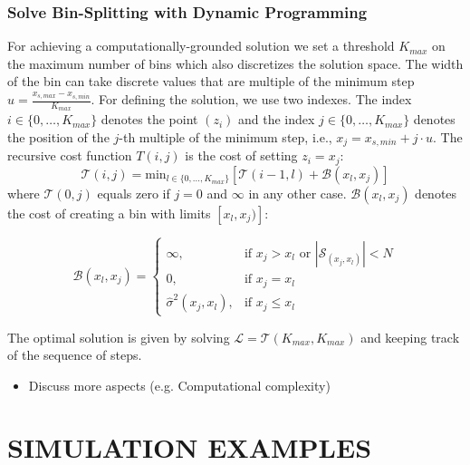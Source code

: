 \documentclass[twoside]{article}
\begin{document}
\subsubsection{Solve Bin-Splitting with Dynamic Programming}
\label{sec:dynamic-programing}

For achieving a computationally-grounded solution we set a threshold
\(K_{max}\) on the maximum number of bins which also discretizes the
solution space. The width of the bin can take discrete values that are
multiple of the minimum step
\(u = \frac{x_{s, max} - x_{s, min}}{K_{max}}\). For defining the
solution, we use two indexes. The index
\(i \in \{0, \ldots, K_{max}\}\) denotes the point \((z_i)\) and the
index \(j \in \{0, \ldots, K_{max}\} \) denotes the position of the
\(j\)-th multiple of the minimum step, i.e., 
\(x_j = x_{s,min} + j \cdot u\). The recursive cost function
\(T(i,j)\) is the cost of setting \(z_i=x_j\):
\begin{equation}
  \label{eq:recursive_cost}
  \mathcal{T}(i,j) = \mathrm{min}_{l \in \{0, \ldots, K_{max}\}} \left [ \mathcal{T}(i-1, l) + \mathcal{B}(x_l, x_j) \right ]
\end{equation}
%
where \(\mathcal{T}(0,j)\) equals zero if \(j=0\) and \(\infty\) in
any other case. \(\mathcal{B}(x_l, x_j)\) denotes the cost of creating a bin
with limits \([x_l, x_j)]\):

\begin{equation}
  \label{eq:cost_step}
  \mathcal{B}(x_l, x_j) = \begin{cases}
                            \infty, & \text{if $x_j > x_l$ or \(|\mathcal{S}_{(x_j, x_l)}| < N\)}\\
                            0, & \text{if $x_j = x_l$}\\
                            \hat{\sigma}^2(x_j, x_l), &\text{if $x_j \leq x_l$}
  \end{cases}
\end{equation}

The optimal solution is given by solving
\(\mathcal{L} = \mathcal{T}(K_{max}, K_{max})\) and keeping track of the sequence of
steps. 

\noindent

\begin{itemize}
\item Discuss more aspects (e.g. Computational complexity)
\end{itemize}

\section{SIMULATION EXAMPLES}
\label{sec:simulation-examples}
\end{document}
